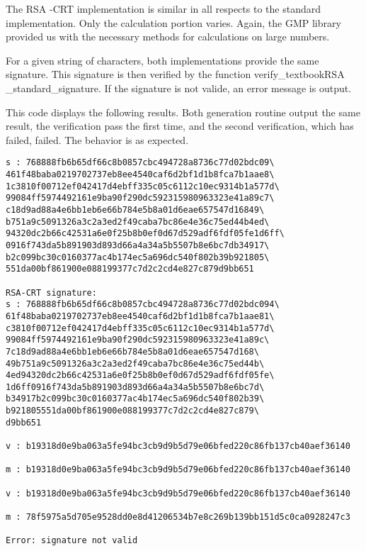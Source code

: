 \documentclass[a4paper]{report}
\begin{document}
The RSA -CRT implementation is similar in all respects to the standard implementation. Only the calculation portion varies. Again, the GMP library provided us with the necessary methods for calculations on large numbers.


For a given string of characters, both implementations provide the same signature. This signature is then verified by the function verify\_textbookRSA\\\_standard\_signature. If the signature is not valide, an error message is output.


This code displays the following results. Both generation routine output the same result, the verification pass the first time, and the second verification, which has failed, failed. The behavior is as expected.

\begin{verbatim}
s : 768888fb6b65df66c8b0857cbc494728a8736c77d02bdc09\
461f48baba0219702737eb8ee4540caf6d2bf1d1b8fca7b1aae8\
1c3810f00712ef042417d4ebff335c05c6112c10ec9314b1a577d\
99084ff5974492161e9ba90f290dc592315980963323e41a89c7\
c18d9ad88a4e6bb1eb6e66b784e5b8a01d6eae657547d16849\
b751a9c5091326a3c2a3ed2f49caba7bc86e4e36c75ed44b4ed\
94320dc2b66c42531a6e0f25b8b0ef0d67d529adf6fdf05fe1d6ff\
0916f743da5b891903d893d66a4a34a5b5507b8e6bc7db34917\
b2c099bc30c0160377ac4b174ec5a696dc540f802b39b921805\
551da00bf861900e088199377c7d2c2cd4e827c879d9bb651

RSA-CRT signature:
s : 768888fb6b65df66c8b0857cbc494728a8736c77d02bdc094\
61f48baba0219702737eb8ee4540caf6d2bf1d1b8fca7b1aae81\
c3810f00712ef042417d4ebff335c05c6112c10ec9314b1a577d\
99084ff5974492161e9ba90f290dc592315980963323e41a89c\
7c18d9ad88a4e6bb1eb6e66b784e5b8a01d6eae657547d168\
49b751a9c5091326a3c2a3ed2f49caba7bc86e4e36c75ed44b\
4ed94320dc2b66c42531a6e0f25b8b0ef0d67d529adf6fdf05fe\
1d6ff0916f743da5b891903d893d66a4a34a5b5507b8e6bc7d\
b34917b2c099bc30c0160377ac4b174ec5a696dc540f802b39\
b921805551da00bf861900e088199377c7d2c2cd4e827c879\
d9bb651

v : b19318d0e9ba063a5fe94bc3cb9d9b5d79e06bfed220c86fb137cb40aef36140

m : b19318d0e9ba063a5fe94bc3cb9d9b5d79e06bfed220c86fb137cb40aef36140

v : b19318d0e9ba063a5fe94bc3cb9d9b5d79e06bfed220c86fb137cb40aef36140

m : 78f5975a5d705e9528dd0e8d41206534b7e8c269b139bb151d5c0ca0928247c3

Error: signature not valid
\end{verbatim}
\end{document}
